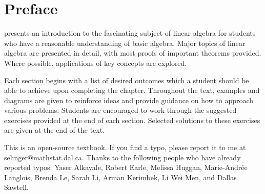 \chapter*{Preface}

\textit{\bookfulltitle} presents an introduction to the fascinating
subject of linear algebra for students who have a reasonable
understanding of basic algebra. Major topics of linear algebra are
presented in detail, with most proofs of important theorems
provided. Where possible, applications of key concepts are explored.

Each section begins with a list of desired outcomes which a student
should be able to achieve upon completing the chapter.  Throughout the
text, examples and diagrams are given to reinforce ideas and provide
guidance on how to approach various problems. Students are encouraged
to work through the suggested exercises provided at the end of each
section. Selected solutions to these exercises are given at the end of
the text.

This is an open-source textbook. If you find a typo, please report it
to me at selinger@mathstat.dal.ca. Thanks to the following people who
have already reported typos: Yaser Alkayale, Robert Earle, Melissa
Huggan, Marie-Andr\'ee Langlois, Brenda Le, Sarah Li, Arman Kerimbek,
Li Wei Men, and Dallas Sawtell.
